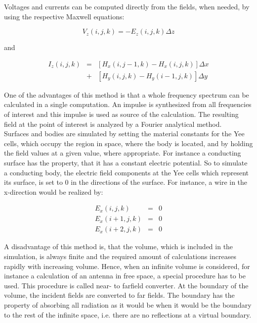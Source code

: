 \documentclass[a4paper,11pt]{report}
\begin{document}
Voltages and currents can be computed directly from the fields, when needed, by using the respective Maxwell equations:

\begin{equation}
V_z(i,j,k)=-E_z(i,j,k) \Delta z 
\end{equation}

and

\begin{eqnarray}
I_z(i,j,k)&=& [H_x(i,j-1,k)-H_x(i,j,k)] \Delta x \\
&+&  [H_y(i,j,k)-H_y(i-1,j,k)] \Delta y
\end{eqnarray}

One of the advantages of this method is that a whole frequency spectrum can be calculated in a single computation. An impulse is synthesized from all frequencies of interest and this impulse is used as source of the calculation. The resulting field at the point of interest is analyzed by a Fourier analytical method.\\

Surfaces and bodies are simulated by setting the material constants for the Yee cells, which occupy the region in space, where the body is located, and by holding the field values at a given value, where appropriate. For instance a conducting surface has the property, that it has a constant electric potential. So to simulate a conducting body, the electric field components at the Yee cells which represent its surface, is set to 0 in the directions of the surface. For instance, a wire in the x-direction would be realized by:

\begin{eqnarray}
E_x(i,j,k)&=&0 \\
E_x(i+1,j,k)&=&0\\ 
E_x(i+2,j,k)&=&0 
\end{eqnarray}

A disadvantage of this method is, that the volume, which is included in the simulation, is always finite and the required amount of calculations increases rapidly with increasing volume. Hence, when an infinite volume is considered, for instance a calculation of an antenna in free space, a special procedure has to be used. This procedure is called near- to farfield converter. At the boundary of the volume, the incident fields are converted to far fields. The boundary has the property of absorbing all radiation as it would be when it would be the boundary to the rest of the infinite space, i.e. there are no reflections at a virtual boundary.\\
\end{document}
